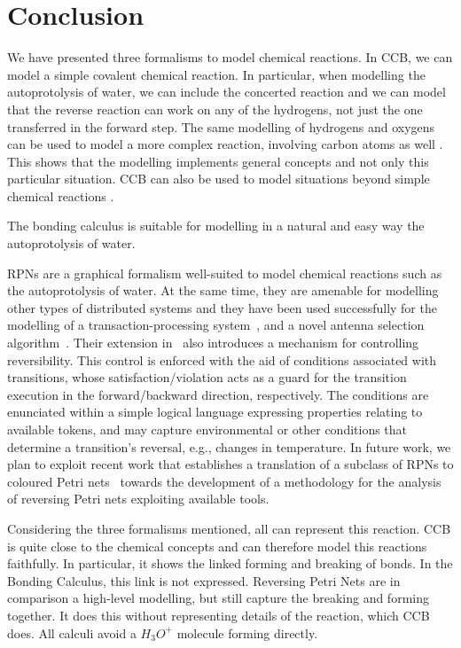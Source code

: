 \documentclass[runningheads]{llncs}
\begin{document}
\section{Conclusion}

We have presented three formalisms to model chemical reactions. In CCB, we can model a simple covalent chemical reaction. In particular, when modelling the autoprotolysis of water, we can include the concerted reaction and we can model that the reverse reaction can work on any of the hydrogens, not just the one transferred in the forward step. The same modelling of hydrogens and oxygens can be used to model a more complex reaction, involving carbon atoms as well \cite{KUHN201818}. This shows that the modelling implements general concepts and not only this particular situation. CCB can also be used to model situations beyond simple chemical reactions  \cite{merevcomp2018}.

The bonding calculus is suitable for modelling in a natural and easy way the autoprotolysis of water.

RPNs are a graphical
formalism well-suited to model chemical reactions such
as the autoprotolysis of water. At the same time, they are amenable for modelling
other types of distributed systems and they have been used successfully for
the modelling of a transaction-processing system~\cite{RPNs}, and a novel antenna selection  algorithm~\cite{RC19}. Their extension in~\cite{RC19} also introduces
a mechanism for controlling reversibility. This control is
enforced with the aid of conditions associated with transitions, whose satisfaction/violation
acts as a guard for the transition execution in the forward/backward direction, respectively. 
The conditions are enunciated within a simple logical language expressing properties 
relating to available tokens, and 
may capture environmental or other conditions that determine a transition's
reversal, e.g., changes in temperature. In future work, we plan to exploit recent work
that establishes a translation of a subclass of RPNs to coloured Petri nets~\cite{RPNtoCPN} towards
the development of a methodology for the analysis of reversing Petri nets exploiting
available tools.

Considering the three formalisms mentioned, all can represent this reaction. CCB is quite close to the chemical concepts and can therefore model this reactions faithfully. In particular, it shows the linked forming and breaking of bonds. In the Bonding Calculus, this link is not expressed. Reversing Petri Nets are in comparison a high-level modelling, but still capture the breaking and forming together. It does this without representing details of the reaction, which CCB does. All calculi avoid a $H_3O^+$ molecule forming directly.
\end{document}
